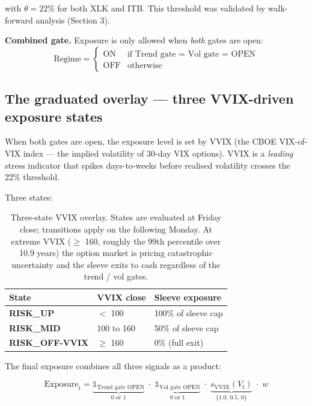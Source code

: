 \documentclass[11pt,a4paper]{article}
\begin{document}
with $\theta = 22\%$ for both XLK and ITB. This threshold was validated by walk-forward analysis (Section 3).

\textbf{Combined gate.} Exposure is only allowed when \emph{both} gates are open:
\[
\text{Regime} = \begin{cases} \text{ON}  & \text{if Trend gate = Vol gate = OPEN} \\ \text{OFF} & \text{otherwise} \end{cases}
\]

\subsection{The graduated overlay --- three VVIX-driven exposure states}

When both gates are open, the exposure level is set by VVIX (the CBOE VIX-of-VIX index --- the implied volatility of 30-day VIX options). VVIX is a \emph{leading} stress indicator that spikes days-to-weeks before realised volatility crosses the 22\% threshold.

Three states:

\begin{table}[H]
\centering
\small
\renewcommand{\arraystretch}{1.2}
\begin{tabular}{lll}
\toprule
\textbf{State} & \textbf{VVIX close} & \textbf{Sleeve exposure} \\
\midrule
\rowcolor{green!10} \textbf{RISK\_UP}    & $<$ 100        & 100\% of sleeve cap \\
\rowcolor{yellow!10} \textbf{RISK\_MID}  & 100 to 160     & 50\% of sleeve cap \\
\rowcolor{red!5}    \textbf{RISK\_OFF-VVIX}  & $\geq$ 160     & 0\% (full exit) \\
\bottomrule
\end{tabular}
\caption{Three-state VVIX overlay. States are evaluated at Friday close; transitions apply on the following Monday. At extreme VVIX ($\geq$ 160, roughly the 99th percentile over 10.9 years) the option market is pricing catastrophic uncertainty and the sleeve exits to cash regardless of the trend / vol gates.}
\end{table}

The final exposure combines all three signals as a product:

\[
\text{Exposure}_t = \underbrace{\mathbb{1}_{\text{Trend gate OPEN}}}_{0 \text{ or } 1} \; \cdot \; \underbrace{\mathbb{1}_{\text{Vol gate OPEN}}}_{0 \text{ or } 1} \; \cdot \; \underbrace{s_{\text{VVIX}}(V_t)}_{\{1.0,\, 0.5,\, 0\}} \; \cdot \; w
\]
\end{document}
